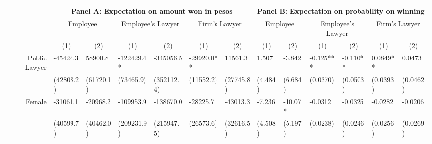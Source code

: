 \begin{tabular}{rrrrrrrrrrrrr}
\toprule
      & \multicolumn{6}{c}{Panel A: Expectation on amount won in pesos} & \multicolumn{6}{c}{Panel B: Expectation on probability on winning} \\
\midrule
      & \multicolumn{2}{c}{Employee} & \multicolumn{2}{c}{Employee's Lawyer } & \multicolumn{2}{c}{Firm's Lawyer } & \multicolumn{2}{c}{Employee} & \multicolumn{2}{c}{Employee's Lawyer } & \multicolumn{2}{c}{Firm's Lawyer } \\
      & \multicolumn{1}{c}{(1)} & \multicolumn{1}{c}{(2)} & \multicolumn{1}{c}{(1)} & \multicolumn{1}{c}{(2)} & \multicolumn{1}{c}{(1)} & \multicolumn{1}{c}{(2)} & \multicolumn{1}{c}{(1)} & \multicolumn{1}{c}{(2)} & \multicolumn{1}{c}{(1)} & \multicolumn{1}{c}{(2)} & \multicolumn{1}{c}{(1)} & \multicolumn{1}{c}{(2)} \\
Public Lawyer & \multicolumn{1}{l}{-45424.3} & \multicolumn{1}{l}{58900.8} & \multicolumn{1}{l}{-122429.4*} & \multicolumn{1}{l}{-345056.5} & \multicolumn{1}{l}{-29920.0**} & \multicolumn{1}{l}{11561.3} & \multicolumn{1}{l}{1.507} & \multicolumn{1}{l}{-3.842} & \multicolumn{1}{l}{-0.125***} & \multicolumn{1}{l}{-0.110**} & \multicolumn{1}{l}{0.0849**} & \multicolumn{1}{l}{0.0473} \\
      & \multicolumn{1}{l}{(42808.2)} & \multicolumn{1}{l}{(61720.1)} & \multicolumn{1}{l}{(73465.9)} & \multicolumn{1}{l}{(352112.4)} & \multicolumn{1}{l}{(11552.2)} & \multicolumn{1}{l}{(27745.8)} & \multicolumn{1}{l}{(4.484)} & \multicolumn{1}{l}{(6.684)} & \multicolumn{1}{l}{(0.0370)} & \multicolumn{1}{l}{(0.0503)} & \multicolumn{1}{l}{(0.0393)} & \multicolumn{1}{l}{(0.0462)} \\
Female & \multicolumn{1}{l}{-31061.1} & \multicolumn{1}{l}{-20968.2} & \multicolumn{1}{l}{-109953.9} & \multicolumn{1}{l}{-138670.0} & \multicolumn{1}{l}{-28225.7} & \multicolumn{1}{l}{-43013.3} & \multicolumn{1}{l}{-7.236} & \multicolumn{1}{l}{-10.07*} & \multicolumn{1}{l}{-0.0312} & \multicolumn{1}{l}{-0.0325} & \multicolumn{1}{l}{-0.0282} & \multicolumn{1}{l}{-0.0206} \\
      & \multicolumn{1}{l}{(40599.7)} & \multicolumn{1}{l}{(40462.0)} & \multicolumn{1}{l}{(209231.9)} & \multicolumn{1}{l}{(215947.5)} & \multicolumn{1}{l}{(26573.6)} & \multicolumn{1}{l}{(32616.5)} & \multicolumn{1}{l}{(4.508)} & \multicolumn{1}{l}{(5.197)} & \multicolumn{1}{l}{(0.0238)} & \multicolumn{1}{l}{(0.0246)} & \multicolumn{1}{l}{(0.0256)} & \multicolumn{1}{l}{(0.0269)} \\

\end{tabular}
